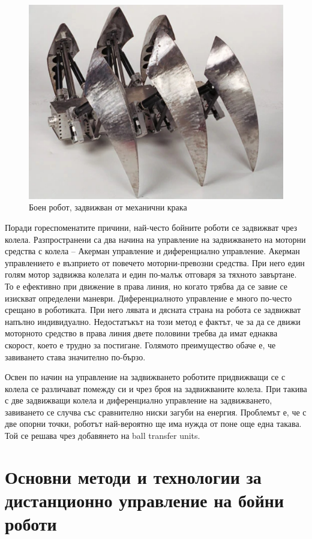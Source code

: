 \begin{figure}[H]
    \centering
    \includegraphics[width=0.6\linewidth]{images/using-legs.jpg}

    \caption{Боен робот, задвижван от механични крака}
    \label{fig:2} 
\end{figure}

Поради гореспоменатите причини, най-често бойните роботи се задвижват чрез колела. Разпространени са два начина на управление на задвижването на моторни средства с колела – Акерман управление и диференциално управление. Акерман управлението е възприето от повечето моторни-превозни средства. При него един голям мотор задвижва колелата и един по-малък отговаря за тяхното завъртане. То е ефективно при движение в права линия, но когато трябва да се завие се изискват определени маневри. Диференциалното управление е много по-често срещано в роботиката. При него лявата и дясната страна на робота се задвижват напълно индивидуално. Недостатъкът на този метод е фактът, че за да се движи моторното средство в права линия двете половини требва да имат еднаква скорост, което е трудно за постигане. Голямото преимущество обаче е, че завиването става значително по-бързо.

Освен по начин на управление на задвижването роботите придвижващи се с колела се различават помежду си и чрез броя на задвижваните колела. При такива с две задвижващи колела и диференциално управление на задвижването, завиването се случва със сравнително ниски загуби на енергия. Проблемът е, че с две опорни точки, роботът най-вероятно ще има нужда от поне още една такава. Той се решава чрез добавянето на ball transfer units.



\section{Основни методи и технологии за дистанционно управление на бойни роботи}


